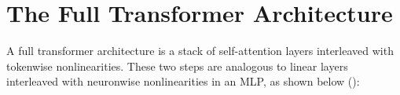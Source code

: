 \section{The Full Transformer Architecture}\label{sec:transformers:ViT_arch}


A full transformer architecture is a stack of self-attention layers interleaved with tokenwise nonlinearities. These two steps are analogous to linear layers interleaved with neuronwise nonlinearities in an MLP, as shown below (\fig{\ref{fig:transformers:transformer_vs_MLP}}):

